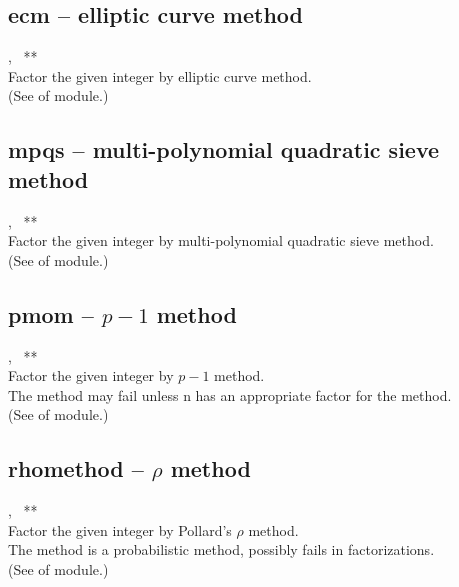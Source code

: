  \subsection{ecm -- elliptic curve method}
   {%
     ,\ %
     **
   }{%
   }\\
   \spacing
   \quad Factor the given integer  by elliptic curve method.\\
   \spacing
   (See  of  module.)\\
%
  \subsection{mpqs -- multi-polynomial quadratic sieve method}
   {%
     ,\ %
     **
   }{%
   }\\
   \spacing
   \quad Factor the given integer  by multi-polynomial quadratic sieve method.\\
   \spacing
   (See  of  module.)\\

  \subsection{pmom -- $p-1$ method}
   {%
     ,\ %
     **
   }{%
   }\\
   \spacing
   \quad Factor the given integer  by \(p-1\) method.\\
   \spacing
   \quad  The method may fail unless n has an appropriate factor for the method.\\
   (See  of  module.)\\

  \subsection{rhomethod -- $\rho$ method}
   {%
     ,\ %
     **
   }{%
   }\\
   \spacing
   \quad Factor the given integer  by Pollard's \(\rho\) method.\\
   \spacing
   \quad The method is a probabilistic method, possibly fails in factorizations.\\
   (See  of  module.)\\
%
